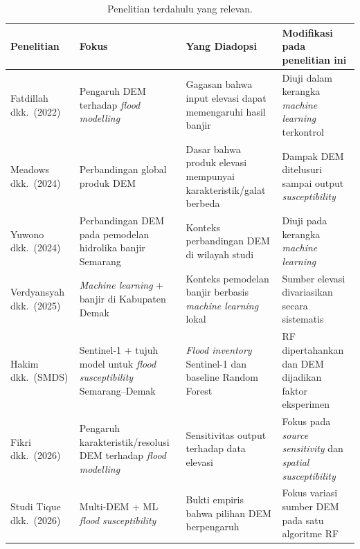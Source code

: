 \documentclass[12pt,a4paper]{article}
\newenvironment{adjustbox}[1]{%
  \begin{lrbox}{\adjboxtemp}%
}{%
  \end{lrbox}%
  \ifdim\wd\adjboxtemp>\textwidth
    \resizebox{\textwidth}{!}{\usebox{\adjboxtemp}}%
  \else
    \usebox{\adjboxtemp}%
  \fi
}
\begin{document}
\begin{table}[!htbp]
\centering
\caption[Penelitian terdahulu yang relevan]{Penelitian terdahulu yang relevan.}
\label{tab:prior}
\begin{adjustbox}{max width=\textwidth}
\begin{tabular}{>{\raggedright}p{2.6cm}
                >{\raggedright}p{3.6cm}
                >{\raggedright}p{3.8cm}
                >{\raggedright\arraybackslash}p{3.8cm}}
\toprule
\textbf{Penelitian} & \textbf{Fokus} & \textbf{Yang Diadopsi} & \textbf{Modifikasi pada penelitian ini} \\
\midrule
Fatdillah dkk.\ (2022) \citep{fatdillah2022} & Pengaruh DEM terhadap \textit{flood modelling} & Gagasan bahwa input elevasi dapat memengaruhi hasil banjir & Diuji dalam kerangka \textit{machine learning} terkontrol \\
Meadows dkk.\ (2024) \citep{meadows2024} & Perbandingan global produk DEM & Dasar bahwa produk elevasi mempunyai karakteristik/galat berbeda & Dampak DEM ditelusuri sampai output \textit{susceptibility} \\
Yuwono dkk.\ (2024) \citep{yuwono2024} & Perbandingan DEM pada pemodelan hidrolika banjir Semarang & Konteks perbandingan DEM di wilayah studi & Diuji pada kerangka \textit{machine learning} \\
Verdyansyah dkk.\ (2025) \citep{verdyansyah2025} & \textit{Machine learning} + banjir di Kabupaten Demak & Konteks pemodelan banjir berbasis \textit{machine learning} lokal & Sumber elevasi divariasikan secara sistematis \\
Hakim dkk.\ (SMDS) \citep{hakim2026} & Sentinel-1 + tujuh model untuk \textit{flood susceptibility} Semarang--Demak & \textit{Flood inventory} Sentinel-1 dan baseline Random Forest & RF dipertahankan dan DEM dijadikan faktor eksperimen \\
Fikri dkk.\ (2026) \citep{fikri2026} & Pengaruh karakteristik/resolusi DEM terhadap \textit{flood modelling} & Sensitivitas output terhadap data elevasi & Fokus pada \textit{source sensitivity} dan \textit{spatial susceptibility} \\
Studi Tique dkk.\ (2026) \citep{Tique2026} & Multi-DEM + ML \textit{flood susceptibility} & Bukti empiris bahwa pilihan DEM berpengaruh & Fokus variasi sumber DEM pada satu algoritme RF \\
\bottomrule
\end{tabular}
\end{adjustbox}
\end{table}
\end{document}
